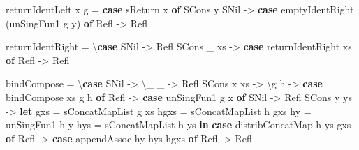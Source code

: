 \documentclass[]{article}
\newenvironment{Shaded}{}{}
\newcommand{\DataTypeTok}[1]{\textcolor[rgb]{0.56,0.13,0.00}{#1}}
\newcommand{\KeywordTok}[1]{\textcolor[rgb]{0.00,0.44,0.13}{\textbf{#1}}}
\newcommand{\NormalTok}[1]{#1}
\newcommand{\OtherTok}[1]{\textcolor[rgb]{0.00,0.44,0.13}{#1}}
\begin{document}
\begin{Shaded}
\begin{Highlighting}[]
\NormalTok{    returnIdentLeft x g }\OtherTok{=} \KeywordTok{case}\NormalTok{ sReturn x }\KeywordTok{of}
      \DataTypeTok{SCons}\NormalTok{ y }\DataTypeTok{SNil} \OtherTok{{-}\textgreater{}} \KeywordTok{case}\NormalTok{ emptyIdentRight (unSingFun1 g y) }\KeywordTok{of}
        \DataTypeTok{Refl} \OtherTok{{-}\textgreater{}} \DataTypeTok{Refl}

\NormalTok{    returnIdentRight }\OtherTok{=}\NormalTok{ \textbackslash{}}\KeywordTok{case}
      \DataTypeTok{SNil}       \OtherTok{{-}\textgreater{}} \DataTypeTok{Refl}
      \DataTypeTok{SCons}\NormalTok{ \_ xs }\OtherTok{{-}\textgreater{}} \KeywordTok{case}\NormalTok{ returnIdentRight xs }\KeywordTok{of}
        \DataTypeTok{Refl} \OtherTok{{-}\textgreater{}} \DataTypeTok{Refl}

\NormalTok{    bindCompose }\OtherTok{=}\NormalTok{ \textbackslash{}}\KeywordTok{case}
      \DataTypeTok{SNil}       \OtherTok{{-}\textgreater{}}\NormalTok{ \textbackslash{}\_ \_ }\OtherTok{{-}\textgreater{}} \DataTypeTok{Refl}
      \DataTypeTok{SCons}\NormalTok{ x xs }\OtherTok{{-}\textgreater{}}\NormalTok{ \textbackslash{}g h }\OtherTok{{-}\textgreater{}} \KeywordTok{case}\NormalTok{ bindCompose xs g h }\KeywordTok{of}
        \DataTypeTok{Refl} \OtherTok{{-}\textgreater{}} \KeywordTok{case}\NormalTok{ unSingFun1 g x }\KeywordTok{of}
          \DataTypeTok{SNil}       \OtherTok{{-}\textgreater{}} \DataTypeTok{Refl}
          \DataTypeTok{SCons}\NormalTok{ y ys }\OtherTok{{-}\textgreater{}}
            \KeywordTok{let}\NormalTok{ gxs  }\OtherTok{=}\NormalTok{ sConcatMapList g xs}
\NormalTok{                hgxs }\OtherTok{=}\NormalTok{ sConcatMapList h gxs}
\NormalTok{                hy   }\OtherTok{=}\NormalTok{ unSingFun1 h y}
\NormalTok{                hys  }\OtherTok{=}\NormalTok{ sConcatMapList h ys}
            \KeywordTok{in}  \KeywordTok{case}\NormalTok{ distribConcatMap h ys gxs }\KeywordTok{of}
                  \DataTypeTok{Refl} \OtherTok{{-}\textgreater{}} \KeywordTok{case}\NormalTok{ appendAssoc hy hys hgxs }\KeywordTok{of}
                    \DataTypeTok{Refl} \OtherTok{{-}\textgreater{}} \DataTypeTok{Refl}


\end{Highlighting}
\end{Shaded}
\end{document}
